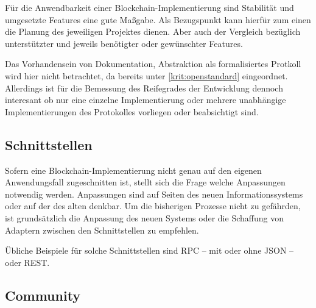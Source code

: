 Für die Anwendbarkeit einer Blockchain-Implementierung sind Stabilität und umgesetzte Features eine gute Maßgabe.
Als Bezugspunkt kann hierfür zum einen die Planung des jeweiligen Projektes dienen.
Aber auch der Vergleich bezüglich unterstützter und jeweils benötigter oder gewünschter Features.

Das Vorhandensein von Dokumentation, Abstraktion als formalisiertes Protkoll wird hier nicht betrachtet, da bereits unter
\ref{krit:openstandard} eingeordnet.
Allerdings ist für die Bemessung des Reifegrades der Entwicklung dennoch interesant ob nur eine einzelne Implementierung oder mehrere unabhängige Implementierungen des Protokolles vorliegen oder beabsichtigt sind.

\subsection{Schnittstellen}\label{krit:schnittstellen}

Sofern eine Blockchain-Implementierung nicht genau auf den eigenen Anwendungsfall zugeschnitten ist, stellt sich die Frage welche Anpassungen notwendig werden.
Anpassungen sind auf Seiten des neuen Informationssystems oder auf der des alten denkbar.
Um die bisherigen Prozesse nicht zu gefährden, ist grundsätzlich die Anpassung des neuen Systems oder die Schaffung von Adaptern zwischen den Schnittstellen zu empfehlen.

Übliche Beispiele für solche Schnittstellen sind \gls{RPC} -- mit oder ohne \gls{JSON} -- oder \gls{REST}.




\subsection{Community}\label{krit:community}

